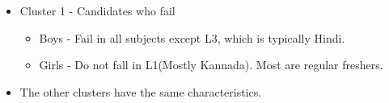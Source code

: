 \begin{itemize}
\begin{itemize}

\item Cluster 1 - Candidates who fail
\begin{itemize}
\item Boys - Fail in all subjects except L3, which is typically Hindi.
\item Girls - Do not fall in L1(Mostly Kannada). Most are regular freshers.
\end{itemize}

\item The other clusters have the same characteristics.

\end{itemize}


\end{itemize}
